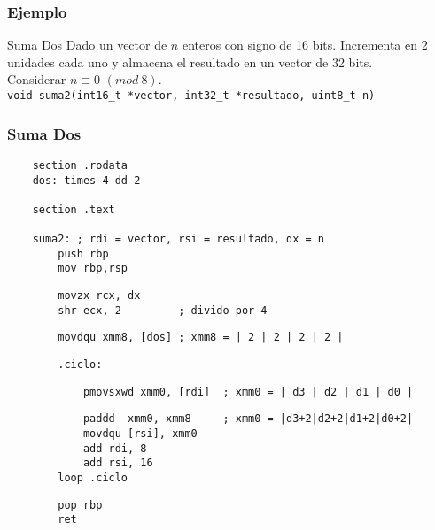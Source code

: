 \documentclass[aspectratio=169]{beamer}
\begin{document}
\begin{frame}[fragile]
    \frametitle{Ejemplo}
    \begin{block}{Suma Dos}
    Dado un vector de $n$ enteros con signo de 16 bits. Incrementa en 2 unidades cada uno y almacena el resultado en un vector de 32 bits.\\
    Considerar $n \equiv 0$ $(mod\ 8)$.\\
    \bigskip
    \verb|void suma2(int16_t *vector, int32_t *resultado, uint8_t n)|
    \end{block}
\end{frame}

\begin{frame}[fragile]
    \frametitle{Suma Dos}
    \scriptsize
    \begin{verbatim}
    section .rodata
    dos: times 4 dd 2

    section .text

    suma2: ; rdi = vector, rsi = resultado, dx = n
        push rbp
        mov rbp,rsp
    \end{verbatim}
    \vspace{-0.8cm} \pause
    \begin{verbatim}
        movzx rcx, dx
        shr ecx, 2         ; divido por 4
    \end{verbatim}
    \vspace{-0.8cm} \pause
    \begin{verbatim}
        movdqu xmm8, [dos] ; xmm8 = | 2 | 2 | 2 | 2 |
    \end{verbatim}
    \vspace{-0.8cm} \pause
    \begin{verbatim}
        .ciclo:
    \end{verbatim}
    \vspace{-0.8cm} \pause
    \begin{verbatim}
            pmovsxwd xmm0, [rdi]  ; xmm0 = | d3 | d2 | d1 | d0 |
    \end{verbatim}
    \vspace{-0.8cm} \pause
    \begin{verbatim}
            paddd  xmm0, xmm8     ; xmm0 = |d3+2|d2+2|d1+2|d0+2|
            movdqu [rsi], xmm0
            add rdi, 8
            add rsi, 16
        loop .ciclo
    \end{verbatim}
    \vspace{-0.8cm} \pause
    \begin{verbatim}
        pop rbp
        ret 
    \end{verbatim}
\end{frame}
\end{document}

